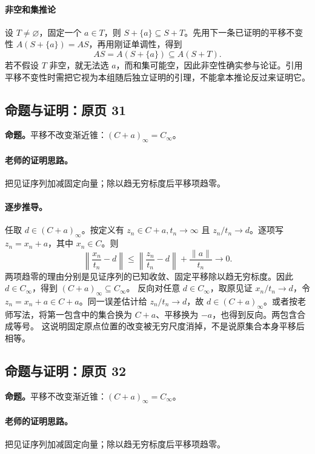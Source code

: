 \paragraph{非空和集推论}设 $T\ne\varnothing$，固定一个 $a\in T$，则 $S+\{a\}\subseteq S+T$。先用下一条已证明的平移不变性 $A(S+\{a\})=AS$，再用刚证单调性，得到
\[AS=A(S+\{a\})\subseteq A(S+T).\]
若不假设 $T$ 非空，就无法选 $a$，而和集可能空，因此非空性确实参与论证。引用平移不变性时需把它视为本组随后独立证明的引理，不能拿本推论反过来证明它。


\subsection{命题与证明：原页 31}

\textbf{命题。}平移不改变渐近锥：$(C+a)_\infty=C_\infty$。

\paragraph{老师的证明思路。}把见证序列加减固定向量；除以趋无穷标度后平移项趋零。

\paragraph{逐步推导。}
任取 $d\in(C+a)_\infty$。按定义有 $z_n\in C+a,t_n\to\infty$ 且 $z_n/t_n\to d$。逐项写 $z_n=x_n+a$，其中 $x_n\in C$。则
\[\left\|\frac{x_n}{t_n}-d\right\|\le\left\|\frac{z_n}{t_n}-d\right\|+\frac{\|a\|}{t_n}\to0.\]
两项趋零的理由分别是见证序列的已知收敛、固定平移除以趋无穷标度。因此 $d\in C_\infty$，得到 $(C+a)_\infty\subseteq C_\infty$。
反向对任意 $d\in C_\infty$，取原见证 $x_n/t_n\to d$，令 $z_n=x_n+a\in C+a$。同一误差估计给 $z_n/t_n\to d$，故 $d\in(C+a)_\infty$。或者按老师写法，将第一包含中的集合换为 $C+a$、平移换为 $-a$，也得到反向。两包含合成等号。
这说明固定原点位置的改变被无穷尺度消掉，不是说原集合本身平移后相等。


\subsection{命题与证明：原页 32}

\textbf{命题。}平移不改变渐近锥：$(C+a)_\infty=C_\infty$。

\paragraph{老师的证明思路。}把见证序列加减固定向量；除以趋无穷标度后平移项趋零。

